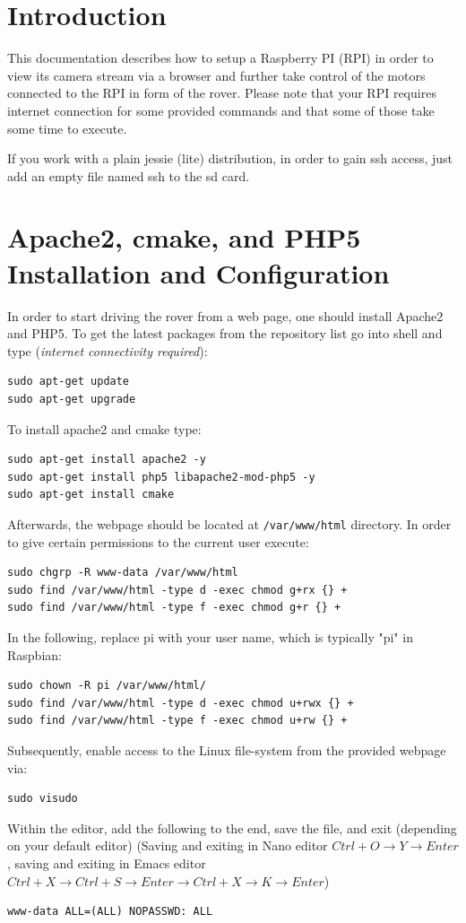 \section{Introduction}
This documentation describes how to setup a Raspberry PI (RPI) in order to view its camera stream via a browser and further take control of the motors connected to the RPI in form of the rover. Please note that your RPI requires internet connection for some provided commands and that some of those take some time to execute.

If you work with a plain jessie (lite) distribution, in order to gain ssh access, just add an empty file named ssh to the sd card.
\section{Apache2, cmake, and PHP5 Installation and Configuration}
	In order to start driving the rover from a web page, one should install Apache2 and PHP5. To get the latest packages from the repository list go into shell and type (\textit{internet connectivity required}):
\begin{lstlisting}
sudo apt-get update
sudo apt-get upgrade
\end{lstlisting}
To install apache2 and cmake type:
\begin{lstlisting}
sudo apt-get install apache2 -y
sudo apt-get install php5 libapache2-mod-php5 -y
sudo apt-get install cmake
\end{lstlisting}
Afterwards, the webpage should be located at \texttt{/var/www/html} directory. In order to give certain permissions to the current user execute: 
\begin{lstlisting}
sudo chgrp -R www-data /var/www/html
sudo find /var/www/html -type d -exec chmod g+rx {} +
sudo find /var/www/html -type f -exec chmod g+r {} +
\end{lstlisting}
In the following, replace pi with your user name, which is typically "pi" in Raspbian:

\begin{lstlisting}
sudo chown -R pi /var/www/html/
sudo find /var/www/html -type d -exec chmod u+rwx {} +
sudo find /var/www/html -type f -exec chmod u+rw {} +
\end{lstlisting}
Subsequently, enable access to the Linux file-system from the provided webpage via:
\begin{lstlisting}
sudo visudo
\end{lstlisting}
Within the editor, add the following to the end, save the file, and exit (depending on your default editor)
(Saving and exiting in Nano editor $Ctrl+O \rightarrow Y \rightarrow Enter$, saving and exiting in Emacs editor $Ctrl + X \rightarrow Ctrl + S \rightarrow Enter \rightarrow Ctrl + X \rightarrow K \rightarrow Enter$) 
\begin{lstlisting}
www-data ALL=(ALL) NOPASSWD: ALL
\end{lstlisting}
